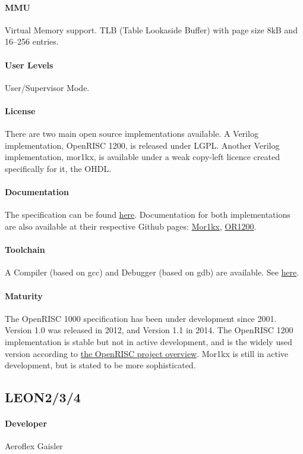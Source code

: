 \paragraph{MMU} Virtual Memory support. TLB (Table Lookaside Buffer) with page size 8kB and 16--256 entries.
\paragraph{User Levels} User/Supervisor Mode.
\paragraph{License} There are two main open source implementations available. A Verilog implementation, OpenRISC 1200, is released under LGPL. Another Verilog implementation, mor1kx, is available under a weak copy-left licence created specifically for it, the OHDL.
\paragraph{Documentation} The specification can be found \href{https://github.com/openrisc/doc/blob/master/openrisc-arch-1.1-rev0.pdf?raw=true}{here}. Documentation for both implementations are also available at their respective Github pages: \href{https://github.com/openrisc/mor1kx}{Mor1kx}, \href{https://github.com/openrisc/or1200}{OR1200}.
\paragraph{Toolchain} A Compiler (based on gcc) and Debugger (based on gdb) are available. See \href{http://opencores.org/or1k/OpenRISC_GNU_tool_chain#Tools}{here}.
\paragraph{Maturity} The OpenRISC 1000 specification has been under development since 2001. Version 1.0 was released in 2012, and Version 1.1 in 2014. The OpenRISC 1200 implementation is stable but not in active development, and is the widely used version according to \href{http://openrisc.github.io/}{the OpenRISC project overview}. Mor1kx is still in active development, but is stated to be more sophisticated.

\subsection{LEON2/3/4}
\paragraph{Developer} Aeroflex Gaisler
